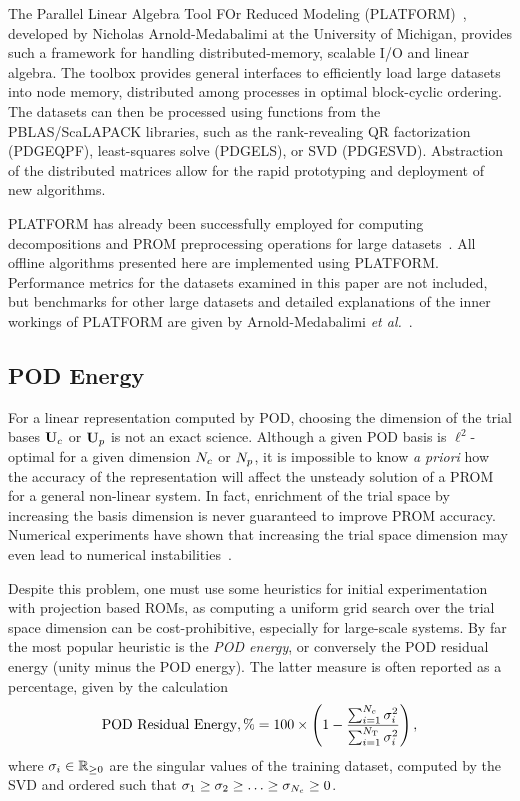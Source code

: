 The Parallel Linear Algebra Tool FOr Reduced Modeling (PLATFORM)~\cite{PLATFORM}, developed by Nicholas Arnold-Medabalimi at the University of Michigan, provides such a framework for handling distributed-memory, scalable I/O and linear algebra. The toolbox provides general interfaces to efficiently load large datasets into node memory, distributed among processes in optimal block-cyclic ordering. The datasets can then be processed using functions from the PBLAS/ScaLAPACK libraries, such as the rank-revealing QR factorization (PDGEQPF), least-squares solve (PDGELS), or SVD (PDGESVD). Abstraction of the distributed matrices allow for the rapid prototyping and deployment of new algorithms.

PLATFORM has already been successfully employed for computing decompositions and PROM preprocessing operations for large datasets~\cite{ArnoldMedabalimi2020,Harvazinski2020,Wentland2021,Pan2021,ArnoldMedabalimi2022}. All offline algorithms presented here are implemented using PLATFORM. Performance metrics for the datasets examined in this paper are not included, but benchmarks for other large datasets and detailed explanations of the inner workings of PLATFORM are given by Arnold-Medabalimi \textit{et al.}~\cite{PLATFORM}.

\subsection{POD Energy}
%
For a linear representation computed by POD, choosing the dimension of the trial bases $\consTrial$ or $\primTrial$ is not an exact science. Although a given POD basis is $\ell^2$-optimal for a given dimension $N_c$ or $N_p$, it is impossible to know \textit{a priori} how the accuracy of the representation will affect the unsteady solution of a PROM for a general non-linear system. In fact, enrichment of the trial space by increasing the basis dimension is never guaranteed to improve PROM accuracy. Numerical experiments have shown that increasing the trial space dimension may even lead to numerical instabilities~\cite{Huang2022}.

Despite this problem, one must use some heuristics for initial experimentation with projection based ROMs, as computing a uniform grid search over the trial space dimension can be cost-prohibitive, especially for large-scale systems. By far the most popular heuristic is the \textit{POD energy}, or conversely the POD residual energy (unity minus the POD energy). The latter measure is often reported as a percentage, given by the calculation
%
\begin{equation}\label{eq:podEnergyResidual}
    \text{POD Residual Energy}, \% = 100 \times \left( 1 - \frac{\sum_{i=1}^{N_c} \sigma_{i}^2}{\sum_{i=1}^{N_{\text{T}}} \sigma_{i}^2} \right),
\end{equation}
%
where $\sigma_{i} \in \mathbb{R}_{\ge 0}$ are the singular values of the training dataset, computed by the SVD and ordered such that $\sigma_1 \ge \sigma_2 \ge \hdots \ge \sigma_{N_c} \ge 0$.

